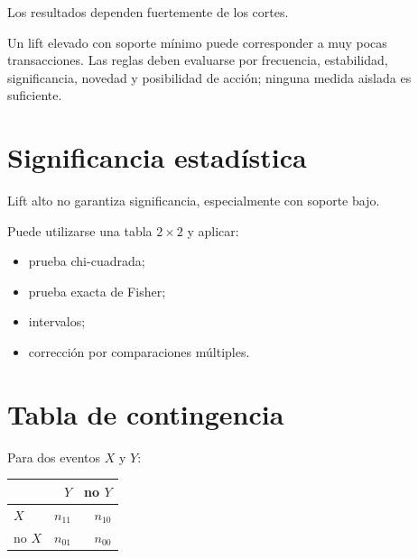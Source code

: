 \documentclass[
  spanish,
  10.5pt,
  letterpaper,
  DIV=11,
  numbers=noendperiod,
  oneside,
  open=any]{scrreprt}
\newcounter{none} %
\providecommand{\tightlist}{%
  \setlength{\itemsep}{0pt}\setlength{\parskip}{0pt}}
\theoremstyle{definition}
\theoremstyle{definition}
\theoremstyle{plain}
\theoremstyle{remark}
\begin{document}
Los resultados dependen fuertemente de los cortes.

\begin{tcolorbox}[enhanced jigsaw, arc=.35mm, bottomrule=.15mm, bottomtitle=1mm, breakable, colback=white, colbacktitle=quarto-callout-warning-color!10!white, colframe=quarto-callout-warning-color-frame, coltitle=black, left=2mm, leftrule=.75mm, opacityback=0, opacitybacktitle=0.6, rightrule=.15mm, title=\textcolor{quarto-callout-warning-color}{\faExclamationTriangle}\hspace{0.5em}{Interés estadístico y utilidad práctica}, titlerule=0mm, toprule=.15mm, toptitle=1mm]

Un lift elevado con soporte mínimo puede corresponder a muy pocas
transacciones. Las reglas deben evaluarse por frecuencia, estabilidad,
significancia, novedad y posibilidad de acción; ninguna medida aislada
es suficiente.

\end{tcolorbox}

\section*{Significancia estadística}\label{significancia-estaduxedstica}


Lift alto no garantiza significancia, especialmente con soporte bajo.

Puede utilizarse una tabla \(2\times2\) y aplicar:

\begin{itemize}
\tightlist
\item
  prueba chi-cuadrada;
\item
  prueba exacta de Fisher;
\item
  intervalos;
\item
  corrección por comparaciones múltiples.
\end{itemize}

\section*{Tabla de contingencia}\label{tabla-de-contingencia}


Para dos eventos \(X\) y \(Y\):

{\def\LTcaptype{none} %
\begin{longtable}[]{@{}lrr@{}}
\toprule\noalign{}
& \(Y\) & no \(Y\) \\
\midrule\noalign{}
\endhead
\bottomrule\noalign{}
\endlastfoot
\(X\) & \(n_{11}\) & \(n_{10}\) \\
no \(X\) & \(n_{01}\) & \(n_{00}\) \\
\end{longtable}
}
\end{document}
